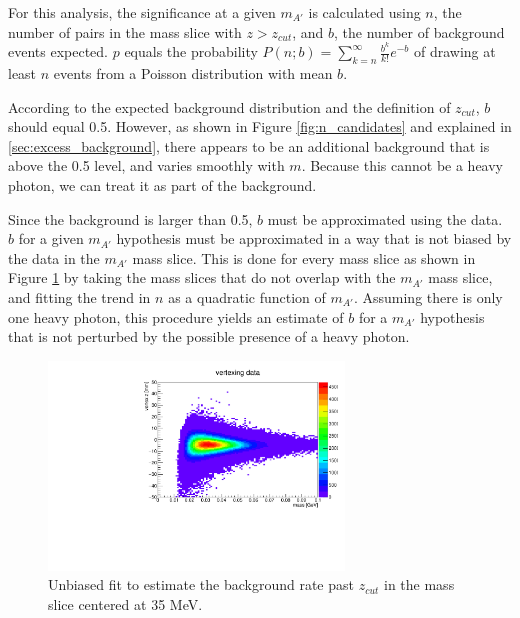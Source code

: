 For this analysis, the significance at a given $m_{A'}$ is calculated using $n$, the number of pairs in the mass slice with $z>z_{cut}$, and $b$, the number of background events expected.
$p$ equals the probability $P(n;b) = \sum^{\infty}_{k=n} \frac{b^k}{k!} e^{-b}$ of drawing at least $n$ events from a Poisson distribution with mean $b$.

According to the expected background distribution and the definition of $z_{cut}$, $b$ should equal 0.5.
However, as shown in Figure \ref{fig:n_candidates} and explained in \ref{sec:excess_background}, there appears to be an additional background that is above the 0.5 level, and varies smoothly with $m$.
Because this cannot be a heavy photon, we can treat it as part of the background.

Since the background is larger than 0.5, $b$ must be approximated using the data.
$b$ for a given $m_{A'}$ hypothesis must be approximated in a way that is not biased by the data in the $m_{A'}$ mass slice.
This is done for every mass slice as shown in Figure \ref{fig:bkg_fit} by taking the mass slices that do not overlap with the $m_{A'}$ mass slice, and fitting the trend in $n$ as a quadratic function of $m_{A'}$.
Assuming there is only one heavy photon, this procedure yields an estimate of $b$ for a $m_{A'}$ hypothesis that is not perturbed by the possible presence of a heavy photon.

\begin{figure}[ht]
\begin{center}
    \includegraphics[width=0.7\textwidth,page=164,angle=-90]{vertexing/figs/golden_mres}
\end{center}
\caption{Unbiased fit to estimate the background rate past $z_{cut}$ in the mass slice centered at 35 MeV.}
    \label{fig:bkg_fit}
\end{figure}

